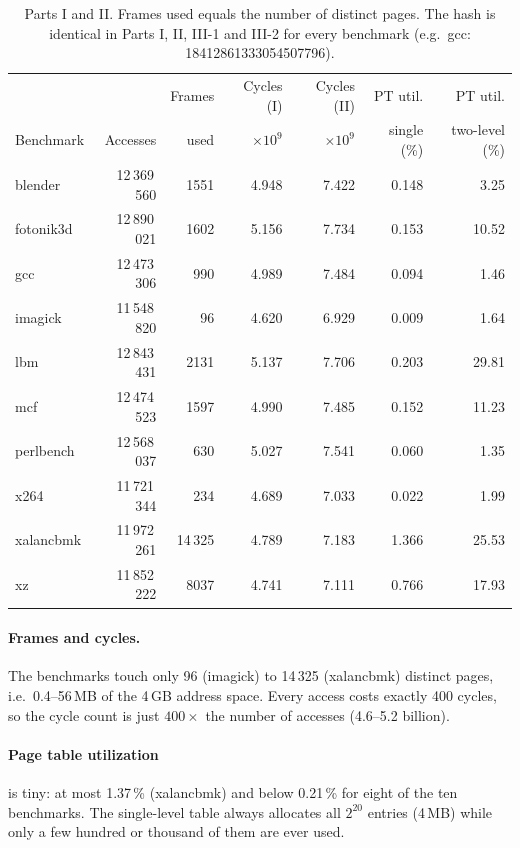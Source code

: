 \documentclass[11pt,a4paper]{article}
\begin{document}
\begin{table}[H]
\centering\small
\begin{tabular}{@{}lrrrrrr@{}}
\toprule
& & Frames & Cycles (I) & Cycles (II) & PT util. & PT util. \\
Benchmark & Accesses & used & $\times10^{9}$ & $\times10^{9}$ & single (\%) & two-level (\%) \\
\midrule
blender   & 12\,369\,560 &  1551 & 4.948 & 7.422 & 0.148 &  3.25 \\
fotonik3d & 12\,890\,021 &  1602 & 5.156 & 7.734 & 0.153 & 10.52 \\
gcc       & 12\,473\,306 &   990 & 4.989 & 7.484 & 0.094 &  1.46 \\
imagick   & 11\,548\,820 &    96 & 4.620 & 6.929 & 0.009 &  1.64 \\
lbm       & 12\,843\,431 &  2131 & 5.137 & 7.706 & 0.203 & 29.81 \\
mcf       & 12\,474\,523 &  1597 & 4.990 & 7.485 & 0.152 & 11.23 \\
perlbench & 12\,568\,037 &   630 & 5.027 & 7.541 & 0.060 &  1.35 \\
x264      & 11\,721\,344 &   234 & 4.689 & 7.033 & 0.022 &  1.99 \\
xalancbmk & 11\,972\,261 & 14\,325 & 4.789 & 7.183 & 1.366 & 25.53 \\
xz        & 11\,852\,222 &  8037 & 4.741 & 7.111 & 0.766 & 17.93 \\
\bottomrule
\end{tabular}
\caption{Parts I and II. Frames used equals the number of distinct pages. The hash is identical
in Parts I, II, III-1 and III-2 for every benchmark (e.g.\ gcc: 18412861333054507796).}
\label{tab:p12}
\end{table}

\paragraph{Frames and cycles.} The benchmarks touch only 96 (imagick) to 14\,325 (xalancbmk)
distinct pages, i.e.\ 0.4--56\,MB of the 4\,GB address space. Every access costs exactly 400
cycles, so the cycle count is just $400\times$ the number of accesses (4.6--5.2 billion).

\paragraph{Page table utilization} is tiny: at most 1.37\,\% (xalancbmk) and below 0.21\,\% for
eight of the ten benchmarks. The single-level table always allocates all $2^{20}$ entries (4\,MB)
while only a few hundred or thousand of them are ever used.
\end{document}
